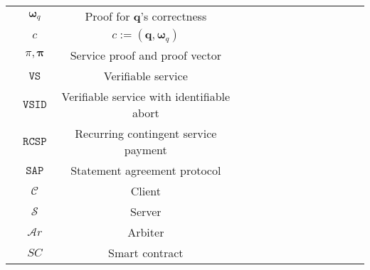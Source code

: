 \begin{table*}[!htbp]
\begin{scriptsize}
\begin{center}
{{\begin{tabular}{|c|c|c|c|c|c|c|c|c|c|c|c|c|c|}
               
&\cellcolor{gray!20}\scriptsize$\bm{\omega}_{\scriptscriptstyle q}$ &\cellcolor{gray!20}\scriptsize Proof for $\bm{q}$'s correctness\\ 
                  
               
&\cellcolor{white!20}\scriptsize$c$ &\cellcolor{white!20}\scriptsize $c:=(\bm{q},\bm{\omega}_{\scriptscriptstyle q})$\\ 
                
                
&\cellcolor{gray!20}\scriptsize$\pi, \bm{\pi}$ &\cellcolor{gray!20}\scriptsize Service proof and proof vector\\ 
                 
                 
&\cellcolor{white!20}\scriptsize$\mathtt{VS}$ &\cellcolor{white!20}\scriptsize Verifiable service\\ 
            
            
&\cellcolor{gray!20}\scriptsize$\mathtt{VSID}$ &\cellcolor{gray!20}\scriptsize Verifiable service with identifiable abort\\ 
                     
                     
&\cellcolor{white!20}\scriptsize$\mathtt{RCSP}$ &\cellcolor{white!20}\scriptsize Recurring contingent service payment\\ 
                       
                       
&\cellcolor{gray!20}\scriptsize$\mathtt{SAP}$ &\cellcolor{gray!20}\scriptsize Statement agreement protocol\\
            
            
&\cellcolor{white!20}\scriptsize$\mathcal C$ &\cellcolor{white!20}\scriptsize Client\\ 
                      
            
&\cellcolor{gray!20}\scriptsize$\mathcal S$ &\cellcolor{gray!20}\scriptsize Server\\ 

           
&\cellcolor{white!20}\scriptsize$\mathcal {A}r$ &\cellcolor{white!20}\scriptsize Arbiter\\ 

      &\cellcolor{gray!20}\scriptsize$SC$ &\cellcolor{gray!20}\scriptsize Smart contract\\ 
                       
                     
    
              
 \hline
  
 

\end{tabular}

}}
\end{center}
\end{scriptsize}
\end{table*}

